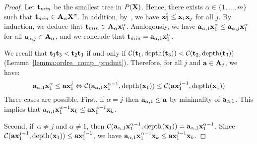 		\begin{proof}
			Let $\tree{t}_{min}$ be the smallest tree in $P(\forest{X})$. 
			Hence, there exists $\alpha \in \{1, \ldots, m\}$ such that $\tree{t}_{min} \in \forest{A}_\alpha \forest{X}^\alpha$. 
			In addition, by~\cite[Lemma 24]{article_arbre}, we have $\tree{x}_1^2 \le \tree{x}_1 \tree{x}_j$ for all $j$. 
			By induction, we deduce that $\tree{t}_{min} \in \forest{A}_\alpha \tree{x}_1^\alpha$. 
			Analogously, we have $\tree{a}_{\alpha,1} \tree{x}_1^\alpha \le \tree{a}_{\alpha,j} \tree{x}_1^\alpha$ for all $\tree{a}_{\alpha,j} \in \forest{A}_\alpha$, and we conclude that $\tree{t}_{min} = \tree{a}_{\alpha,1} \tree{x}_1^\alpha$.
			
			We recall that $\tree{t}_1 \tree{t}_3 < \tree{t}_2 \tree{t}_3$ if and only if $\cut{\tree{t}_1}{\depth{\tree{t}_3}} < \cut{\tree{t}_2}{\depth{\tree{t}_3}}$ (Lemma~\ref{lemma:ordre_comp_produit}). 
			Therefore, for all $j$ and $\tree{a} \in \forest{A}_j$, we have:
			\[\tree{a}_{\alpha,1} \tree{x}_1^\alpha \le \tree{a} \tree{x}_1^j \Leftrightarrow \cut{\tree{a}_{\alpha,1} \tree{x}_1^{\alpha-1}}{\depth{\tree{x}_1}} \le \cut{\tree{a} \tree{x}_1^{j-1}}{\depth{\tree{x}_1}}\]
			Three cases are possible.
			First, if  $\alpha = j$ then $\tree{a}_{\alpha,1} \le  \tree{a}$ by minimality of $\tree{a}_{\alpha,1}$.
			This implies that $\tree{a}_{\alpha,1} \tree{x}_1^{\alpha-1} \tree{x}_k \le \tree{a} \tree{x}_1^{\alpha-1} \tree{x}_k$.
	
			Second, if~$\alpha \ne j$ and $\alpha \neq 1$, then $\cut{\tree{a}_{\alpha,1} \tree{x}_1^{\alpha-1}}{\depth{\tree{x}_1}} = \tree{a}_{\alpha,1} \tree{x}_1^{\alpha-1}$. 
			Since $\cut{\tree{a} \tree{x}_1^{j-1}}{\depth{\tree{x}_1}} \le\tree{a} \tree{x}_1^{j-1}$, we have $\tree{a}_{\alpha,1} \tree{x}_1^{\alpha-1} \tree{x}_k \le \tree{a} \tree{x}_1^{j-1} \tree{x}_k$. 
			

\end{proof}
